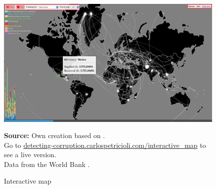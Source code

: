 \begin{figure}[H]
\begin{center}
\caption{Interactive map}
\label{fig_interactive_map}
\includegraphics[width=\textwidth,height=1\textheight,keepaspectratio]{../img/interactive_map_mex.pdf}
\end{center}
\noindent \footnotesize{\textbf{Source:} Own creation based on \cite{wb_i_map}. \\Go to \href{http://detecting-corruption.carlospetricioli.com/interactive_map}{detecting-corruption.carlospetricioli.com/interactive\_map} to see a live version. \\Data from the World Bank \parencite{wb_data}.}
\end{figure}





